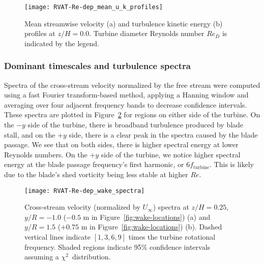 \begin{figure}[ht]
    \centering
    
    \texttt{[image: RVAT-Re-dep\_mean\_u\_k\_profiles]}
    
    \caption{Mean streamwise velocity (a) and turbulence kinetic energy (b)
        profiles at $z/H=0.0$. Turbine diameter Reynolds number $Re_D$ is indicated
        by the legend.}
    
    \label{fig:profiles}
\end{figure}



\subsubsection{Dominant timescales and turbulence spectra}

Spectra of the cross-stream velocity normalized by the free stream were computed
using a fast Fourier transform-based method, applying a Hanning window and
averaging over four adjacent frequency bands to decrease confidence intervals.
These spectra are plotted in Figure~\ref{fig:wake-spectra} for regions on either
side of the turbine. On the $-y$ side of the turbine, there is broadband
turbulence produced by blade stall, and on the $+y$ side, there is a clear peak
in the spectra caused by the blade passage. We see that on both sides, there is
higher spectral energy at lower Reynolds numbers. On the $+y$ side of the
turbine, we notice higher spectral energy at the blade passage frequency's first
harmonic, or $6 f_\mathrm{turbine}$. This is likely due to the blade's shed
vorticity being less stable at higher $Re$.

\begin{figure}
    \centering
    
    \texttt{[image: RVAT-Re-dep\_wake\_spectra]}
    
    \caption{Cross-stream velocity (normalized by $U_\infty$) spectra at
        $z/H=0.25$, $y/R=-1.0$ ($-0.5$ m in Figure~\ref{fig:wake-locations}) (a) and
        $y/R=1.5$ ($+0.75$ m in Figure~\ref{fig:wake-locations}) (b). Dashed
        vertical lines indicate $[1, 3, 6, 9]$ times the turbine rotational
        frequency. Shaded regions indicate 95\% confidence intervals assuming a
        $\chi^2$~distribution.}
    
    \label{fig:wake-spectra}
\end{figure}


